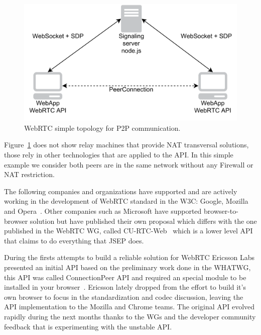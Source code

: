  \begin{figure}[h]
  \centering
    \includegraphics[width=1\textwidth]{./figures/webrtcExample.pdf}
      \caption[WebRTC simple topology for P2P communication]{WebRTC simple topology for P2P communication.}
	\label{fig:webrtcExample}
\end{figure}

Figure~\ref{fig:webrtcExample} does not show relay machines that provide NAT transversal solutions, those rely in other technologies that are applied to the API. In this simple example we consider both peers are in the same network without any Firewall or NAT restriction.

The following companies and organizations have supported and are actively working in the development of WebRTC standard in the W3C: Google, Mozilla and Opera~\cite{googleAnnouncement}. Other companies such as Microsoft have supported browser-to-browser solution but have published their own proposal which differs with the one published in the WebRTC WG, called CU-RTC-Web~\cite{curtcweb} which is a lower level API that claims to do everything that JSEP does.

During the firsts attempts to build a reliable solution for WebRTC Ericsson Labs presented an initial API based on the preliminary work done in the WHATWG, this API was called ConnectionPeer API and required an special module to be installed in your browser~\cite{ericssonwebrtc}. Ericsson lately dropped from the effort to build it's own browser to focus in the standardization and codec discussion, leaving the API implementation to the Mozilla and Chrome teams. The original API evolved rapidly during the next months thanks to the WGs and the developer community feedback that is experimenting with the unstable API.


